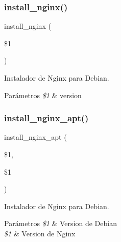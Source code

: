 \subsubsection{\texorpdfstring{install\+\_\+nginx()}{install\_nginx()}}
{\footnotesize\ttfamily install\+\_\+nginx (\begin{DoxyParamCaption}\item[{}]{\$1 }\end{DoxyParamCaption})}



Instalador de Nginx para Debian. 


\begin{DoxyParams}{Parámetros}
{\em \$1} & version \\
\hline
\end{DoxyParams}
\mbox{\label{Apache__Nginx__Debian_8sh_a919a039d139e2c48f79368fc8a909d0d}} 
\subsubsection{\texorpdfstring{install\+\_\+nginx\+\_\+apt()}{install\_nginx\_apt()}}
{\footnotesize\ttfamily install\+\_\+nginx\+\_\+apt (\begin{DoxyParamCaption}\item[{}]{\$1,  }\item[{}]{\$1 }\end{DoxyParamCaption})}



Instalador de Nginx para Debian. 


\begin{DoxyParams}{Parámetros}
{\em \$1} & Version de Debian \\
\hline
{\em \$1} & Version de Nginx \\
\hline
\end{DoxyParams}
